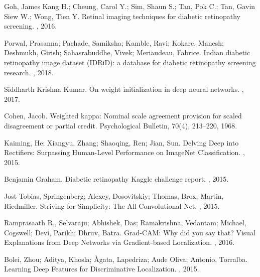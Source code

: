 \documentclass{article}
\begin{document}
  

\begin{thebibliography}{1}

  Goh, James Kang H.; Cheung, Carol Y.; Sim, Shaun S.; Tan, Pok C.; Tan, Gavin Siew W.; Wong, Tien Y.
  \newblock Retinal imaging techniques for diabetic retinopathy screening.
  , 2016.

  Porwal, Prasanna; Pachade, Samiksha; Kamble, Ravi; Kokare, Manesh; Deshmukh, Girish; Sahasrabuddhe, Vivek; Meriaudeau, Fabrice.
  \newblock Indian diabetic retinopathy image dataset (IDRiD): a database for diabetic retinopathy screening research.
  , 2018.

  Siddharth Krishna Kumar.
  \newblock On weight initialization in deep neural networks.
  , 2017.

  Cohen, Jacob. 
  \newblock Weighted kappa: Nominal scale agreement provision for scaled disagreement or partial credit. 
  \newblock Psychological Bulletin, 70(4), 213–220, 1968. 

  Kaiming, He; Xiangyu, Zhang; Shaoqing, Ren; Jian, Sun.
  \newblock Delving Deep into Rectifiers: Surpassing Human-Level Performance on ImageNet Classification.
  , 2015.

  Benjamin Graham.
  \newblock Diabetic retinopathy Kaggle challenge report.
  , 2015.

  Jost Tobias, Springenberg; Alexey, Dosovitskiy; Thomas, Brox; Martin, Riedmiller.
  \newblock Striving for Simplicity: The All Convolutional Net.
  , 2015.

  Ramprasaath R., Selvaraju; Abhishek, Das; Ramakrishna, Vedantam; Michael, Cogswell; Devi, Parikh; Dhruv, Batra.
  \newblock Grad-CAM: Why did you say that? Visual Explanations from Deep Networks via Gradient-based Localization.
  , 2016.

  Bolei, Zhou; Aditya, Khosla; {\`{A}}gata, Lapedriza; Aude Oliva; Antonio, Torralba.
  \newblock Learning Deep Features for Discriminative Localization.
  , 2015.




  \end{thebibliography}
\end{document}
